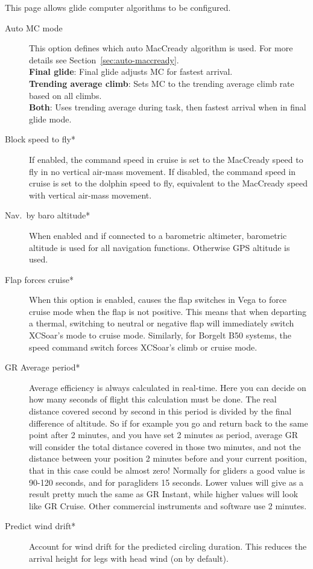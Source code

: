 This page allows glide computer algorithms to be configured.

\begin{description}
\item[Auto MC mode]  This option defines which auto MacCready algorithm is used.
  For more details see Section~\ref{sec:auto-maccready}. \\
  {\bf Final glide}: Final glide adjusts MC for fastest arrival.
 \\
  {\bf Trending average climb}: Sets MC to the trending average climb rate based 
  on all climbs. \\
  {\bf Both}: Uses trending average during task, then fastest arrival when in final 
  glide mode.
\item[Block speed to fly*]  If enabled, the command speed in cruise
  is set to the MacCready speed to fly in no vertical air-mass movement.
  If disabled, the command speed in cruise is set to the dolphin speed to fly,
  equivalent to the MacCready speed with vertical air-mass movement.
\item[Nav.\ by baro altitude*]  When enabled and if connected to a barometric
  altimeter, barometric altitude is used for all navigation functions. Otherwise
  GPS altitude is used.
\item[Flap forces cruise*]
  When this option is enabled, causes the flap switches in Vega to
  force cruise mode when the flap is not positive. This means that
  when departing a thermal, switching to neutral or negative flap will
  immediately switch XCSoar's mode to cruise mode.
  Similarly, for Borgelt B50 systems, the speed command switch forces
  XCSoar's climb or cruise mode.
\item[GR Average period*]  Average efficiency is always calculated in real-time. 
  Here you can decide on how many seconds of flight this calculation must be done. 
  The real distance covered second by second in this period is divided by the final 
  difference of altitude.  So if for example you go and return back to the same point 
  after 2 minutes, and you have set 2 minutes as period, average GR will consider the 
  total distance covered in those two minutes, and not the distance between your 
  position 2 minutes before and your current position, that in this case could be 
  almost zero! Normally for gliders a good value is 90-120 seconds, and for paragliders 
  15 seconds. Lower values will give as a result pretty much the same as GR Instant, 
  while higher values will look like GR Cruise. Other commercial instruments and 
  software use 2 minutes.
\item[Predict wind drift*]  \label{conf:predict-drift}Account for wind drift for the predicted circling 
  duration. This reduces the arrival height for legs with head wind (on by default).
\end{description}



